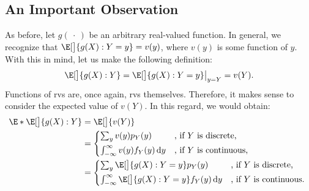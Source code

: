 \subsection*{An Important Observation}
As before, let $ g(\:\cdot\:) $ be an arbitrary real-valued function. In general, we recognize that $ \E[\big]{g(X)\given Y=y}=v(y) $,
where $ v(y) $ is some function of $ y $. With this in mind, let us make the following definition:
\[ \E[\big]{g(X)\given Y}=\E[\big]{g(X)\given Y=y}\big\rvert_{y=Y}=v(Y). \]
Functions of rvs are, once again, rvs themselves. Therefore, it makes sense to consider the
expected value of $v(Y)$. In this regard, we would obtain:
\begin{align*}
    \E*{\E[\big]{g(X)\given Y}}
     & =\E[\big]{v(Y)}                                                                            \\
     & =\begin{cases*}
            \sum_y v(y)p_Y(y)                         & , if $ Y $ is discrete,   \\
            \int_{-\infty}^{\infty}v(y)f_Y(y)\odif{y} & , if $ Y $ is continuous,
        \end{cases*}                     \\
     & =\begin{cases*}
            \sum_y\E[\big]{g(X)\given Y=y}p_Y(y)                          & , if $ Y $ is discrete,   \\
            \int_{-\infty}^{\infty}\E[\big]{g(X)\given Y=y}f_Y(y)\odif{y} & , if $ Y $ is continuous.
        \end{cases*}
\end{align*}
